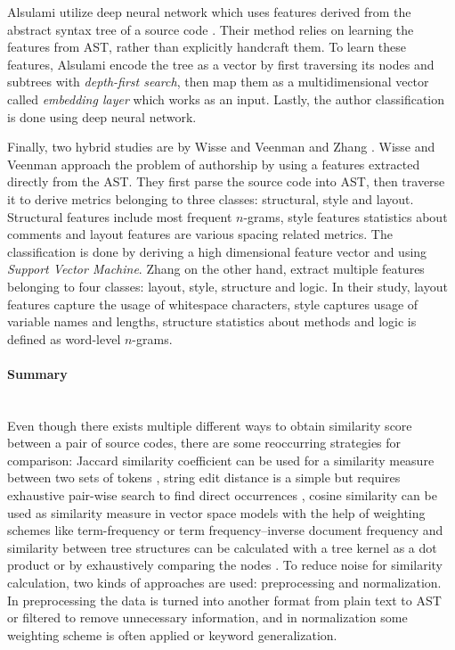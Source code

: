 Alsulami \etal utilize deep neural network which uses features derived from the abstract syntax tree of a source code \cite{SCAANN2017}. Their method relies on learning the features from AST, rather than explicitly handcraft them. To learn these features, Alsulami \etal encode the tree as a vector by first traversing its nodes and subtrees with \emph{depth-first search}, then map them as a multidimensional vector called \emph{embedding layer} which works as an input. Lastly, the author classification is done using deep neural network. 

Finally, two hybrid studies are by Wisse and Veenman \cite{SDNAIJSP2015} and Zhang \etal \cite{AISC2017}. Wisse and Veenman approach the problem of authorship by using a features extracted directly from the AST. They first parse the source code into AST, then traverse it to derive metrics belonging to three classes: structural, style and layout. Structural features include most frequent $n$-grams, style features statistics about comments and layout features are various spacing related metrics. The classification is done by deriving a high dimensional feature vector and using \emph{Support Vector Machine}. Zhang \etal on the other hand, extract multiple features belonging to four classes: layout, style, structure and logic. In their study, layout features capture the usage of whitespace characters, style captures usage of variable names and lengths, structure statistics about methods and logic is defined as word-level $n$-grams.

\paragraph{Summary}\mbox{}\\
Even though there exists multiple different ways to obtain similarity score between a pair of source codes, there are some reoccurring strategies for comparison: Jaccard similarity coefficient can be used for a similarity measure between two sets of tokens \cite{PACASCD2005, BUAA2009, OTIOLSS2015, ramirez2015high}, string edit distance is a simple but requires exhaustive pair-wise search to find direct occurrences \cite{LICD2010, ASTMLPD2013, CPDPPD2013}, cosine similarity can be used as similarity measure in vector space models with the help of weighting schemes like term-frequency or term frequency–inverse document frequency \cite{AASCPD2012, USCR2014, Heblikar2015NormalizationBS, OTIOLSS2015, ramirez2015high} and similarity between tree structures can be calculated with a tree kernel as a dot product or by exhaustively comparing the nodes \cite{AAPSCDPTK2013, Fu2017WASTKAW, TBCFPD2012}. To reduce noise for similarity calculation, two kinds of approaches are used: preprocessing and normalization. In preprocessing the data is turned into another format \eg from plain text to AST or filtered to remove unnecessary information, and in normalization some weighting scheme is often applied or keyword generalization.

